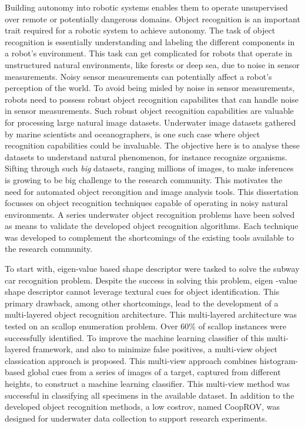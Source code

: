 Building autonomy into robotic systems enables them to operate 
unsupervised over remote or potentially dangerous domains.
Object recognition is an important trait required for a robotic system to achieve autonomy.
The task of object recognition is essentially understanding and labeling the different components in a robot's environment. This task can get complicated for robots that operate in unstructured natural environments, like forests or deep sea, due to noise in sensor measurements. Noisy sensor measurements can potentially affect a robot's perception of the world. To avoid being misled by noise in sensor measurements, robots need to possess robust object recognition capabilites that can handle noise in sensor measurements. Such robust object recognition capabilities are valuable for processing large natural image datasets. Underwater image datasets gathered by marine scientists and oceanographers, is one such case where object recognition capabilities could be invaluable. The objective here is to analyse these datasets to understand natural phenomenon, for instance recognize organisms. Sifting through such \emph{big} datasets, ranging millions of images, to make inferences is growing to be big challenge to the research community. This motivates the need for automated object recongition and image analysis tools.
This dissertation focusses on object recognition techniques capable of operating in noisy natural environments.
A series underwater object recognition  problems have been solved as means to validate the developed object recognition algorithms. 
Each technique was developed to complement the shortcomings of the existing tools available to the research community. 

To start with, eigen-value based shape descriptor were tasked to solve the subway car recognition problem. Despite the success in solving this problem, eigen -value shape descriptor cannot leverage textural cues for object identification. This primary drawback, among other shortcomings, lead to the development of a multi-layered object recognition architecture. This multi-layered architecture was tested on an scallop enumeration problem. Over 60\% of scallop instances were successfully identified. To improve the machine learning classifier of this multi-layered framework, and also to minimize false positives, a multi-view object classication approach is proposed. This multi-view approach combines histogram-based global cues from a series of images of a target, captured from different heights, to construct a machine learning classifier. This multi-view method was successful in classifying all specimens in the available dataset. In addition to the developed object recognition methods, a low cost\gls{rov}, 
named CoopROV, was designed for underwater data collection to support research experiments.
